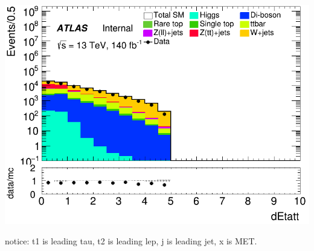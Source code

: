 \documentclass[usenames,dvipsnames]{beamer}
\begin{document}
\begin{frame}
    \begin{minipage}{0.32\textwidth}
        \centering
        \includegraphics[width=\textwidth]{graphics/LH_met/LH_met_dEtatt.png}
    \end{minipage}
    
    \vspace{0.5cm} %
    
    notice: t1 is leading tau, t2 is leading lep, j is leading jet, x is MET.
\end{frame}
\end{document}
